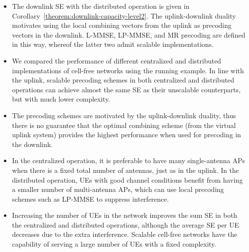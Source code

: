 \begin{mdframed}[style=GrayFrame]

\begin{itemize}

\item The downlink SE with the distributed operation is given in Corollary~\ref{theorem:downlink-capacity-level2}. The uplink-downlink duality motivates using the local combining vectors from the uplink as precoding vectors in the downlink. L-MMSE, LP-MMSE, and MR precoding are defined in this way, whereof the latter two admit scalable implementations.

\item We compared the performance of different centralized and distributed implementations of cell-free networks using the running example. In line with the uplink, scalable precoding schemes in both centralized and distributed operations can achieve almost the same SE as their unscalable counterparts, but with much lower complexity.

\item The precoding schemes are motivated by the uplink-downlink duality, thus there is no guarantee that the optimal combining scheme (from the virtual uplink system) provides the highest performance when used for precoding in the downlink.

\item In the centralized operation, it is preferable to have many single-antenna APs when there is a fixed total number of  antennas, just as in the uplink.
In the distributed operation, UEs with good channel conditions benefit from having a smaller number of multi-antenna APs, which can use local precoding schemes such as LP-MMSE to suppress interference.

\item Increasing the number of UEs in the network improves the sum SE in both the centralized and distributed operations, although the average SE per UE decreases due to the extra interference. Scalable cell-free networks have the capability of serving a large number of UEs with a fixed complexity.

\end{itemize}

\end{mdframed}

